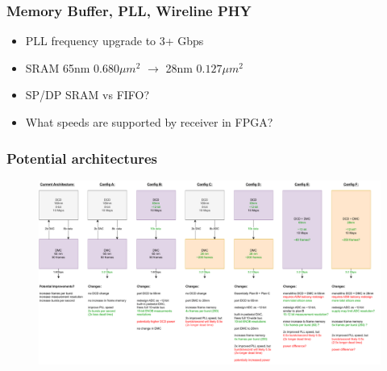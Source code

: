 \documentclass{beamer}
\begin{document}
\begin{frame}
    \frametitle{Memory Buffer, PLL, Wireline PHY}
    \begin{itemize}
    \item PLL frequency upgrade to 3+ Gbps
    \item SRAM 65nm $0.680\mu m^2$ $\rightarrow$ 28nm $0.127\mu m^2$
    \item SP/DP SRAM vs FIFO?
    \item What speeds are supported by receiver in FPGA?
    \end{itemize}
\end{frame}

\begin{frame}
    \frametitle{Potential architectures}
    \begin{figure}
    \includegraphics[width=\textwidth]{edet_architectures.drawio.pdf}
    \end{figure}
\end{frame}
\end{document}
